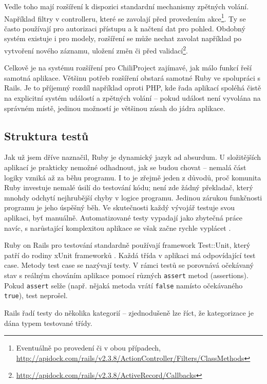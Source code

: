 \documentclass[thesis=B,czech]{FITthesis}[2012/05/02]
\begin{document}
Vedle toho mají rozšíření k dispozici standardní mechanismy zpětných volání.
Například filtry v controlleru, které se
zavolají před provedením akce\footnote{Eventuálně po provedení či v obou
  případech,
  \url{http://apidock.com/rails/v2.3.8/ActionController/Filters/ClassMethods}}. Ty se
často používají pro autorizaci přístupu a k načtení dat pro
pohled. Obdobný systém existuje i pro modely, rozšíření se může nechat
zavolat například po vytvoření nového záznamu, uložení změn či před
validací\footnote{\url{http://apidock.com/rails/v2.3.8/ActiveRecord/Callbacks}}.

Celkově je na systému rozšíření pro ChiliProject zajímavé, jak málo
funkcí řeší samotná aplikace. Většinu potřeb rozšíření obstará samotné
Ruby ve spolupráci s Rails. Je to příjemný rozdíl například oproti PHP,
kde řada aplikací spoléhá čistě na explicitní systém událostí
a zpětných volání -- pokud událost není vyvolána na správném místě, jedinou možností je
většinou zásah do jádra aplikace.

\subsection{Struktura testů}
\label{sec:rails_tests}

Jak už jsem dříve naznačil, Ruby je dynamický jazyk ad absurdum.
U složitějších aplikací je prakticky nemožné odhadnout, jak se budou chovat
-- nemalá část logiky vzniká až za běhu programu. I to
je zřejmě jeden z důvodů, proč komunita Ruby investuje nemalé úsilí do
testování kódu; není zde žádný překladač, který mnohdy odchytí nejhrubější chyby
v logice programu. Jedinou zárukou funkčnosti programu je jeho úspěšný běh.
Ve skutečnosti každý vývojář testuje svou aplikaci, byť manuálně.
Automatizované testy vypadají jako zbytečná práce navíc, s narůstající
komplexitou aplikace se však začne rychle vyplácet \citep{Rappin2011}.

Ruby on Rails pro testování standardně používají framework Test::Unit,
který patří do rodiny xUnit frameworků \citep{FowlerXunit}. Každá třída
v aplikaci má odpovídající test case. Metody test case se nazývají
testy. V rámci testů se porovnává očekávaný stav s reálným chováním
aplikace pomocí různých \lstinline!assert! metod (assertions). Pokud
\lstinline!assert! selže (např. nějaká metoda vrátí \lstinline!false!
namísto očekávaného \lstinline!true!), test neprošel.

Rails řadí testy do několika kategorií -- zjednodušeně lze říct, že
kategorizace je dána typem testované třídy.
\end{document}
